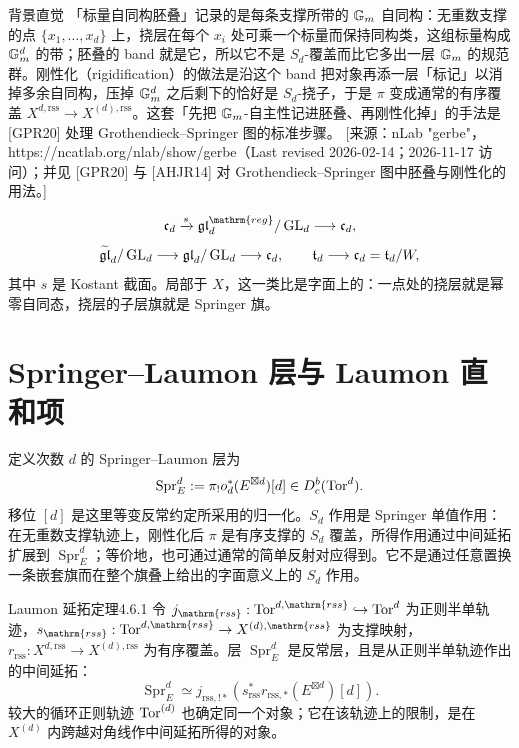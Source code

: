 \begin{transnote}{背景直觉}
「标量自同构胚叠」记录的是每条支撑所带的 $\mathbb{G}_{m}$ 自同构：无重数支撑的点 $\{x_1,\ldots,x_d\}$ 上，挠层在每个 $x_i$ 处可乘一个标量而保持同构类，这组标量构成 $\mathbb{G}_{m}^d$ 的带；胚叠的 band 就是它，所以它不是 $S_d$-覆盖而比它多出一层 $\mathbb{G}_{m}$ 的规范群。刚性化（rigidification）的做法是沿这个 band 把对象再添一层「标记」以消掉多余自同构，压掉 $\mathbb{G}_{m}^d$ 之后剩下的恰好是 $S_d$-挠子，于是 $\pi$ 变成通常的有序覆盖 $X^{d,\mathrm{rss}}\to X^{(d),\mathrm{rss}}$。这套「先把 $\mathbb{G}_{m}$-自主性记进胚叠、再刚性化掉」的手法是 [GPR20] 处理 Grothendieck–Springer 图的标准步骤。
[来源：nLab "gerbe"，https://ncatlab.org/nlab/show/gerbe（Last revised 2026-02-14；2026-11-17 访问）；并见 [GPR20] 与 [AHJR14] 对 Grothendieck–Springer 图中胚叠与刚性化的用法。]
\end{transnote}
\[\mathfrak c_d\xrightarrow{s}\mathfrak{gl}_d^{\mathrm{reg}}/\GL_d\longrightarrow\mathfrak c_d,\]
\[\widetilde{\mathfrak{gl}}_d/\operatorname{GL}_d\longrightarrow\mathfrak{gl}_d/\operatorname{GL}_d\longrightarrow\mathfrak c_d,\qquad\mathfrak t_d\longrightarrow\mathfrak c_d=\mathfrak t_d/W,\]
其中 $s$ 是 Kostant 截面。局部于 $X$，这一类比是字面上的：一点处的挠层就是幂零自同态，挠层的子层旗就是 Springer 旗。
\section{Springer–Laumon 层与 Laumon 直和项}\label{sec:4.6}
定义次数 $d$ 的 Springer–Laumon 层为
\[\operatorname{Spr}_E^d:=\pi_!o_d^*(E^{\boxtimes d})[d]\in D_c^b(\operatorname{Tor}^d).\]
移位 $[d]$ 是这里等变反常约定所采用的归一化。$S_d$ 作用是 Springer 单值作用\cite{AHJR14}：在无重数支撑轨迹上，刚性化后 $\pi$ 是有序支撑的 $S_d$ 覆盖，所得作用通过中间延拓扩展到 $\operatorname{Spr}_E^d$；等价地，也可通过通常的简单反射对应得到。它不是通过任意置换一条嵌套旗而在整个旗叠上给出的字面意义上的 $S_d$ 作用。
\begin{theorem}{Laumon 延拓定理\cite{KL85}}{4.6.1}
令 $j_{\mathrm{rss}}:\Tor^{d,\mathrm{rss}}\hookrightarrow\Tor^d$ 为正则半单轨迹，$s_{\mathrm{rss}}:\Tor^{d,\mathrm{rss}}\to X^{(d),\mathrm{rss}}$ 为支撑映射，$r_{\mathrm{rss}}:X^{d,\mathrm{rss}}\to X^{(d),\mathrm{rss}}$ 为有序覆盖。层 $\operatorname{Spr}_E^d$ 是反常层，且是从正则半单轨迹作出的中间延拓：
\[\operatorname{Spr}_E^d\simeq j_{\mathrm{rss},!*}(s_{\mathrm{rss}}^*r_{\mathrm{rss},*}(E^{\boxtimes d})[d]).\]
较大的循环正则轨迹 $\operatorname{Tor}^{(d)}$ 也确定同一个对象；它在该轨迹上的限制，是在 $X^{(d)}$ 内跨越对角线作中间延拓所得的对象。
\end{theorem}

